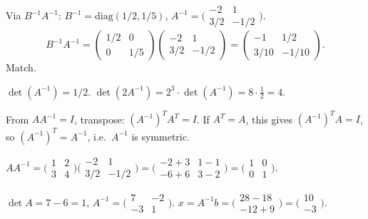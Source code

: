 \begin{solutions}
    Via $B^{-1} A^{-1}$: $B^{-1} = \mathrm{diag}(1/2, 1/5)$, $A^{-1} = \bigl(\begin{smallmatrix} -2 & 1 \\ 3/2 & -1/2 \end{smallmatrix}\bigr)$.
    \[
    B^{-1} A^{-1} = \begin{pmatrix} 1/2 & 0 \\ 0 & 1/5 \end{pmatrix} \begin{pmatrix} -2 & 1 \\ 3/2 & -1/2 \end{pmatrix} = \begin{pmatrix} -1 & 1/2 \\ 3/10 & -1/10 \end{pmatrix}.
    \]
    Match.
    \item $\det(A^{-1}) = 1/2$. $\det(2 A^{-1}) = 2^{3} \cdot \det(A^{-1}) = 8 \cdot \tfrac{1}{2} = 4$.
    \item From $A A^{-1} = I$, transpose: $(A^{-1})^{T} A^{T} = I$. If $A^{T} = A$, this gives $(A^{-1})^{T} A = I$, so $(A^{-1})^{T} = A^{-1}$, i.e.\ $A^{-1}$ is symmetric.
    \item $A A^{-1} = \bigl(\begin{smallmatrix} 1 & 2 \\ 3 & 4 \end{smallmatrix}\bigr) \bigl(\begin{smallmatrix} -2 & 1 \\ 3/2 & -1/2 \end{smallmatrix}\bigr) = \bigl(\begin{smallmatrix} -2 + 3 & 1 - 1 \\ -6 + 6 & 3 - 2 \end{smallmatrix}\bigr) = \bigl(\begin{smallmatrix} 1 & 0 \\ 0 & 1 \end{smallmatrix}\bigr)$.
    \item $\det A = 7 - 6 = 1$, $A^{-1} = \bigl(\begin{smallmatrix} 7 & -2 \\ -3 & 1 \end{smallmatrix}\bigr)$. $x = A^{-1} b = \bigl(\begin{smallmatrix} 28 - 18 \\ -12 + 9 \end{smallmatrix}\bigr) = \bigl(\begin{smallmatrix} 10 \\ -3 \end{smallmatrix}\bigr)$.

\end{solutions}
